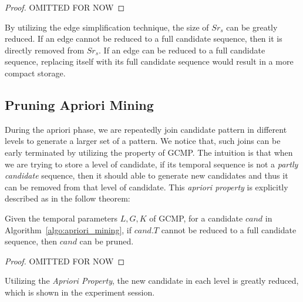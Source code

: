 \begin{proof}
OMITTED FOR NOW
\end{proof}
By utilizing the edge simplification technique, the size of $Sr_s$ can be greatly reduced. If
an edge cannot be reduced to a full candidate sequence, then it is directly removed from $Sr_s$.
If an edge can be reduced to a full candidate sequence, replacing itself with its full candidate sequence 
would result in a more compact storage.

\subsection{Pruning Apriori Mining}
During the apriori phase, we are repeatedly join candidate pattern in different levels to generate a larger set
of a pattern. We notice that, such joins can be early terminated 
by utilizing the property of GCMP. The intuition is that when we are trying to store a level of candidate, if its
temporal sequence is not a \emph{partly candidate} sequence, then it should able to generate new candidates and thus it
can be removed from that level of candidate. This \emph{apriori property} 
is explicitly described as in the follow theorem:

\begin{theorem}
Given the temporal parameters $L,G,K$ of GCMP, for a candidate $cand$ in Algorithm~\ref{algo:apriori_mining},
if $cand.T$ cannot be reduced to a full candidate sequence, then $cand$ can be pruned.
\end{theorem}
\begin{proof}
OMITTED FOR NOW
\end{proof}

Utilizing the \emph{Apriori Property}, the new candidate in each level is greatly reduced, which is shown in
the experiment session.
